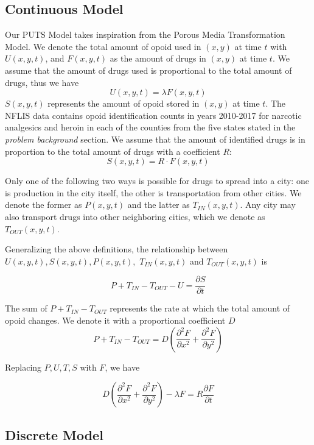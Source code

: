 \subsection{Continuous Model}
Our PUTS Model takes inspiration from the Porous Media Transformation Model.%
We denote the total amount of opoid used in $(x,y)$ at time $t$ with $U(x,y,t)$, and $F(x,y,t)$ as the amount of drugs in $(x,y)$ at time $t$. We assume that the amount of drugs used is proportional to the total amount of drugs, thus we have
\begin{equation}
U(x,y,t)=\lambda F(x,y,t)
\end{equation}
$S(x,y,t)$ represents the amount of opoid stored in $(x,y)$ at time $t$. The NFLIS data contains opoid identification counts in years 2010-2017 for narcotic analgesics and heroin in each of the counties from the five states stated in the \textit{problem background} section. We assume that the amount of identified drugs is in proportion to the total amount of drugs with a coefficient $R$:
\begin{equation}
S(x,y,t) = R\cdot F(x,y,t)
\end{equation}

Only one of the following two ways is possible for drugs to spread into a city: one is production in the city itself, the other is transportation from other cities. We denote the former as $P(x,y,t)$ and the latter as $T_{IN}(x,y,t)$. Any city may also transport drugs into other neighboring cities, which we denote as $T_{OUT}(x,y,t)$.

Generalizing the above definitions, the relationship between $U(x,y,t), S(x,y,t), P(x,y,t),$ $T_{IN}(x,y,t)$ and $T_{OUT}(x,y,t)$ is

\begin{equation}
P+T_{IN}-T_{OUT}-U=\frac{\partial S}{\partial t} 
\end{equation}

The sum of $P+T_{IN}-T_{OUT}$ represents the rate at which the total amount of opoid changes. We denote it with a proportional coefficient $D$
\begin{equation}
P+T_{IN}-T_{OUT} =D(\frac{\partial^2 F}{\partial x^2} + \frac{\partial^2 F}{\partial y^2})
\end{equation}

Replacing $P, U, T, S$ with $F$, we have

\begin{equation}
D(\frac{\partial^2 F}{\partial x^2} + \frac{\partial^2 F}{\partial y^2})- \lambda F =
R \frac{\partial F}{\partial t}
\end{equation}

 
\subsection{Discrete Model}